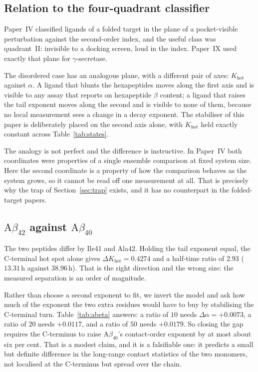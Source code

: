 \documentclass[11pt,reqno]{amsart}
\theoremstyle{plain}
\theoremstyle{definition}
\theoremstyle{remark}
\numberwithin{equation}{section}
\newcommand{\Ab}{\mathrm{A}\beta}
\newcommand{\Khot}{K_{\mathrm{hot}}}
\begin{document}
\subsection{Relation to the four-quadrant classifier}
\label{sec:quadrants}
Paper~IV classified ligands of a folded target in the plane of a pocket-visible perturbation against the second-order index, and the useful class was quadrant~II: invisible to a docking screen, loud in the index. Paper~IX used exactly that plane for $\gamma$-secretase.

The disordered case has an analogous plane, with a different pair of axes: $\Khot$ against $\alpha$. A ligand that blunts the hexapeptides moves along the first axis and is visible to any assay that reports on hexapeptide $\beta$ content; a ligand that raises the tail exponent moves along the second and is visible to none of them, because no local measurement sees a change in a decay exponent. The stabiliser of this paper is deliberately placed on the second axis alone, with $\Khot$ held exactly constant across Table~\ref{tab:states}.

The analogy is not perfect and the difference is instructive. In Paper~IV both coordinates were properties of a single ensemble comparison at fixed system size. Here the second coordinate is a property of how the comparison behaves as the system grows, so it cannot be read off one measurement at all. That is precisely why the trap of Section~\ref{sec:trap} exists, and it has no counterpart in the folded-target papers.

\subsection{\texorpdfstring{$\Ab_{42}$ against $\Ab_{40}$}{Abeta42 against Abeta40}}
\label{sec:abeta}
The two peptides differ by Ile41 and Ala42. Holding the tail exponent equal, the C-terminal hot spot alone gives $\Delta\Khot=0.4274$ and a half-time ratio of $2.93$ ($13.31$\,h against $38.96$\,h). That is the right direction and the wrong size: the measured separation is an order of magnitude.

Rather than choose a second exponent to fit, we invert the model and ask how much of the exponent the two extra residues would have to buy by stabilising the C-terminal turn. Table~\ref{tab:abeta} answers: a ratio of $10$ needs $\Delta\alpha=+0.0073$, a ratio of $20$ needs $+0.0117$, and a ratio of $50$ needs $+0.0179$. So closing the gap requires the C-terminus to raise $\Ab_{40}$'s contact-order exponent by at most about six per cent. That is a modest claim, and it is a falsifiable one: it predicts a small but definite difference in the long-range contact statistics of the two monomers, not localised at the C-terminus but spread over the chain.
\end{document}
